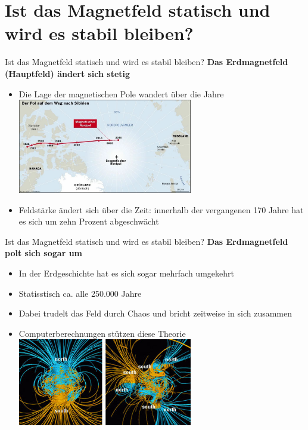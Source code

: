 \documentclass[10pt]{beamer}
\begin{document}
\section{Ist das Magnetfeld statisch und wird es stabil bleiben?}
\begin{frame}{Ist das Magnetfeld statisch und wird es stabil bleiben?}
\textbf{Das Erdmagnetfeld (Hauptfeld) ändert sich stetig}\pause
\begin{itemize}
    \item Die Lage der magnetischen Pole wandert über die Jahre
    \includegraphics[width=0.6\textwidth]{Polwanderung.jpg}
    \item Feldstärke ändert sich über die Zeit: innerhalb der vergangenen 170 Jahre hat es sich um zehn Prozent abgeschwächt
    
    
\end{itemize}
\end{frame}

\begin{frame}{Ist das Magnetfeld statisch und wird es stabil bleiben?}
\textbf{Das Erdmagnetfeld polt sich sogar um}\pause
\begin{itemize}
      
       \item In der Erdgeschichte hat es sich sogar mehrfach umgekehrt \pause
    \item Statisstisch ca. alle 250.000 Jahre\pause
    \item Dabei trudelt das Feld durch Chaos und bricht zeitweise in sich zusammen\pause
    \item Computerberechnungen stützen diese Theorie
      \includegraphics[width=0.6\textwidth]{Erdmagnetfeld-Umpolung}
    
\end{itemize}
\end{frame}
\end{document}

